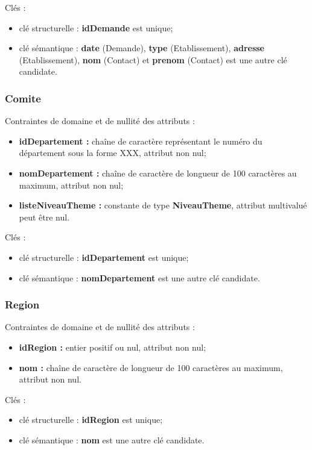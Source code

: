 Clés : 
\begin{itemize}
\item clé structurelle : \textbf{idDemande} est unique;
\item clé sémantique : \textbf{date} (Demande), \textbf{type} (Etablissement), \textbf{adresse} (Etablissement), \textbf{nom} (Contact) et \textbf{prenom} (Contact) est une autre clé candidate. \\ 
\end{itemize}

\subsubsection*{Comite}
Contraintes de domaine et de nullité des attributs :
\begin{itemize}
	\item \textbf{idDepartement :} chaîne de caractère représentant le numéro du département sous la forme XXX, attribut non nul;
	\item \textbf{nomDepartement :} chaîne de caractère de longueur de 100 caractères au maximum, attribut non nul;
	\item \textbf{listeNiveauTheme :} constante de type \textbf{NiveauTheme}, attribut multivalué peut être nul. \\
\end{itemize}

Clés : 
\begin{itemize}
\item clé structurelle : \textbf{idDepartement} est unique;
\item clé sémantique : \textbf{nomDepartement} est une autre clé candidate. \\ 
\end{itemize}

\subsubsection*{Region}
Contraintes de domaine et de nullité des attributs :
\begin{itemize}
	\item \textbf{idRegion :} entier positif ou nul, attribut non nul;
	\item \textbf{nom :} chaîne de caractère de longueur de 100 caractères au maximum, attribut non nul.\\
\end{itemize}

Clés : 
\begin{itemize}
\item clé structurelle : \textbf{idRegion} est unique;
\item clé sémantique : \textbf{nom} est une autre clé candidate. \\ 
\end{itemize}



